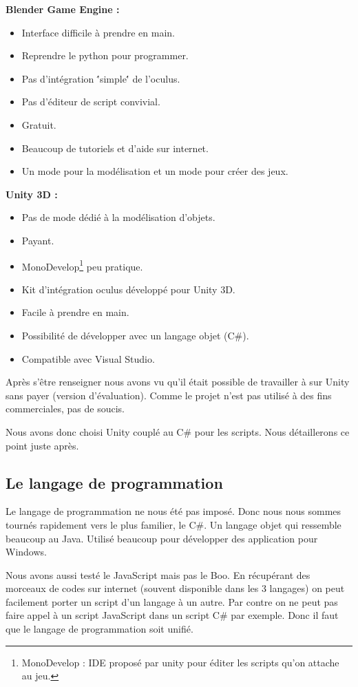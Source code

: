 \documentclass[a4paper,11pt]{myreport}
\begin{document}
  \begin{description}
  	\item \textbf{Blender Game Engine :}
  	\begin{itemize}
  		\item Interface difficile à prendre en main.
  		\item Reprendre le python pour programmer.
  		\item Pas d'intégration \''simple\'' de l'oculus.
  		\item Pas d'éditeur de script convivial.
  		\item Gratuit.
  		\item Beaucoup de tutoriels et d'aide sur internet.
  		\item Un mode pour la modélisation et un mode pour créer des jeux.
  	\end{itemize}
  	\item \textbf{Unity 3D :}
  		\begin{itemize}
  			\item Pas de mode dédié à la modélisation d'objets.
  			\item Payant.
  			\item MonoDevelop\footnote{MonoDevelop : IDE proposé par unity pour éditer les scripts qu'on attache au jeu.} peu pratique.
  			\item Kit d'intégration oculus développé pour Unity 3D.
  			\item Facile à prendre en main.
  			\item Possibilité de développer avec un langage objet (C\#).
  			\item Compatible avec Visual Studio.
  		\end{itemize}
  \end{description}
  
  \par Après s'être renseigner nous avons vu qu'il était possible de travailler à sur Unity sans payer (version d'évaluation). Comme le projet n'est pas utilisé à des fins commerciales, pas de soucis.
  \par Nous avons donc choisi Unity couplé au C\# pour les scripts. Nous détaillerons ce point juste après.
  
  \subsection{Le langage de programmation}
  \par Le langage de programmation ne nous été pas imposé. Donc nous nous sommes tournés rapidement vers le plus familier, le C\#. Un langage objet qui ressemble beaucoup au Java. Utilisé beaucoup pour développer des application pour Windows.
  \par Nous avons aussi testé le JavaScript mais pas le Boo. En récupérant des morceaux de codes sur internet (souvent disponible dans les 3 langages) on peut facilement porter un script d'un langage à un autre.
  Par contre on ne peut pas faire appel à un script JavaScript dans un script C\# par exemple. Donc il faut que le langage de programmation soit unifié.
\end{document}

